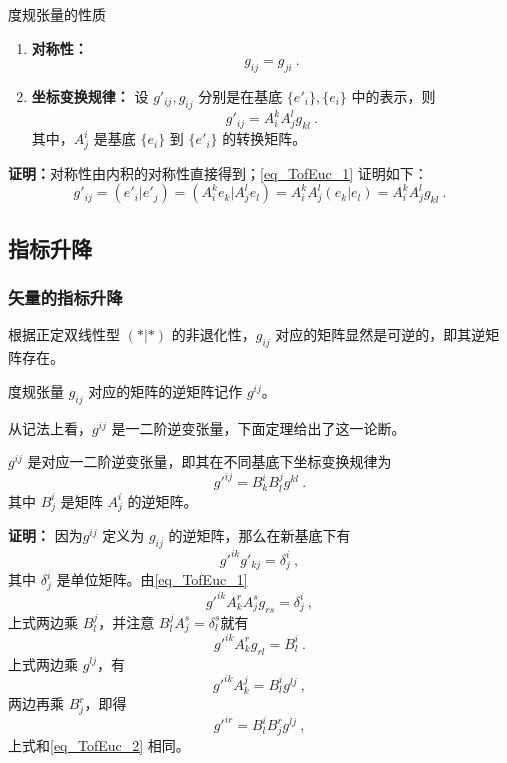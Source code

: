 \begin{theorem}{度规张量的性质}
\begin{enumerate}
\item \textbf{对称性：}\begin{equation}
g_{ij}=g_{ji}~.
\end{equation}
\item \textbf{坐标变换规律：} 设 $g'_{ij},g_{ij}$ 分别是在基底 $\{e'_i\},\{e_i\}$ 中的表示，则
\begin{equation}\label{eq_TofEuc_1}
g'_{ij}=A^k_{i} A^l_{j}g_{kl}~.
\end{equation}
其中，$A^i_j$ 是基底 $\{e_i\}$ 到 $\{e'_i\}$ 的转换矩阵。
\end{enumerate}
\end{theorem}
\textbf{证明：}对称性由内积的对称性直接得到；\autoref{eq_TofEuc_1} 证明如下：
\begin{equation}
g'_{ij}=(e'_i|e'_j)=(A^k_i e_k|A^l_j e_l)=A^k_{i} A^l_{j}(e_k|e_l)=A^k_{i} A^l_{j}g_{kl}~.
\end{equation}

\subsection{指标升降}
\subsubsection{矢量的指标升降}
根据正定双线性型 $(*|*)$ 的非退化性，$g_{ij}$ 对应的矩阵显然是可逆的，即其逆矩阵存在。
\begin{definition}{}
度规张量 $g_{ij}$ 对应的矩阵的逆矩阵记作 $g^{ij}$。
\end{definition}
从记法上看，$g^{ij}$ 是一二阶逆变张量，下面定理给出了这一论断。
\begin{theorem}{}
$g^{ij}$ 是对应一二阶逆变张量，即其在不同基底下坐标变换规律为
\begin{equation}\label{eq_TofEuc_2}
g'^{ij}=B^i_kB^j_l g^{kl}~.
\end{equation}
其中 $B^i_j$ 是矩阵 $A^i_j$ 的逆矩阵。
\end{theorem} 

\textbf{证明：}
因为$g^{ij}$ 定义为 $g_{ij}$ 的逆矩阵，那么在新基底下有 \begin{equation}
g'^{ik}g'_{kj}=\delta^i_j~,
\end{equation}
其中 $\delta^i_j$ 是单位矩阵。由\autoref{eq_TofEuc_1} 
\begin{equation}
g'^{ik}A^r_k A^s_j g_{rs}=\delta^i_j~,
\end{equation}
上式两边乘 $B^j_l$，并注意 $B^j_lA^s_j=\delta^s_l$就有
\begin{equation}
g'^{ik}A^r_k g_{rl}=B^
i_l~.
\end{equation}
上式两边乘 $g^{lj}$，有
\begin{equation}
g'^{ik}A^j_k=B^i_lg^{lj}~,
\end{equation}
两边再乘 $B^r_j$，即得
\begin{equation}
g'^{ir}=B^i_lB^r_jg^{lj}~,
\end{equation}
上式和\autoref{eq_TofEuc_2} 相同。

